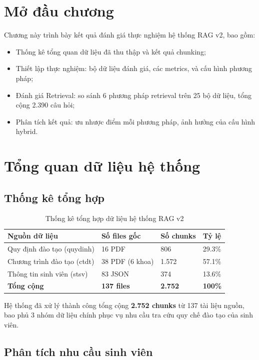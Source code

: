 \documentclass[../DoAn.tex]{subfiles}
\begin{document}
\section{Mở đầu chương}
Chương này trình bày kết quả đánh giá thực nghiệm hệ thống RAG v2, bao gồm:
\begin{itemize}
    \item Thống kê tổng quan dữ liệu đã thu thập và kết quả chunking;
    \item Thiết lập thực nghiệm: bộ dữ liệu đánh giá, các metrics, và cấu hình phương pháp;
    \item Đánh giá Retrieval: so sánh 6 phương pháp retrieval trên 25 bộ dữ liệu, tổng cộng 2.390 câu hỏi;
    \item Phân tích kết quả: ưu nhược điểm mỗi phương pháp, ảnh hưởng của cấu hình hybrid.
\end{itemize}

\section{Tổng quan dữ liệu hệ thống}

\subsection{Thống kê tổng hợp}
\begin{table}[h]
\centering
\begin{tabular}{|l|l|l|l|}
\hline
\textbf{Nguồn dữ liệu} & \textbf{Số files gốc} & \textbf{Số chunks} & \textbf{Tỷ lệ} \\
\hline
Quy định đào tạo (quydinh) & 16 PDF & 806 & 29.3\% \\
\hline
Chương trình đào tạo (ctdt) & 38 PDF (6 khoa) & 1.572 & 57.1\% \\
\hline
Thông tin sinh viên (stsv) & 83 JSON & 374 & 13.6\% \\
\hline
\textbf{Tổng cộng} & \textbf{137 files} & \textbf{2.752} & \textbf{100\%} \\
\hline
\end{tabular}
\caption{Thống kê tổng hợp dữ liệu hệ thống RAG v2}
\end{table}

Hệ thống đã xử lý thành công tổng cộng \textbf{2.752 chunks} từ 137 tài liệu nguồn, bao phủ 3 nhóm dữ liệu chính phục vụ nhu cầu tra cứu quy chế đào tạo của sinh viên.

\subsection{Phân tích nhu cầu sinh viên}
\end{document}
